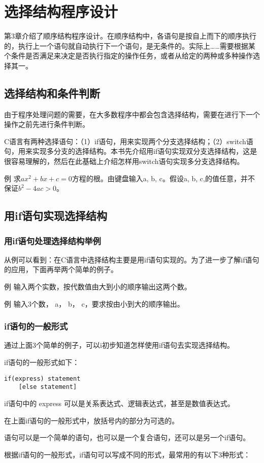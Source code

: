 \chapter{选择结构程序设计}
第3章介绍了顺序结构程序设计。在顺序结构中，各语句是按自上而下的顺序执行的，执行上一个语句就自动执行下一个语句，是无条件的。实际上……需要根据某个条件是否满足来决定是否执行指定的操作任务，或者从给定的两种或多种操作选择其一。
\section{选择结构和条件判断}
由于程序处理问题的需要，在大多数程序中都会包含选择结构，需要在进行下一个操作之前先进行条件判断。

C语言有两种选择语句：（1）if语句，用来实现两个分支选择结构；（2）switch语句，用来实现多分支的选择结构。本书先介绍用if语句实现双分支选择结构，这是很容易理解的，然后在此基础上介绍怎样用switch语句实现多分支选择结构。

例 求$a x^2 + bx + c=0$方程的根。由键盘输入a, b, c。假设a, b, c,的值任意，并不保证$b^2 -4ac >0$。
\section{用if语句实现选择结构}
\subsection{用if语句处理选择结构举例}
从例可以看到：在C语言中选择结构主要是用if语句实现的。为了进一步了解if语句的应用，下面再举两个简单的例子。

例 输入两个实数，按代数值由大到小的顺序输出这两个数。

例 输入3个数， a， b， c，要求按由小到大的顺序输出。
\subsection{if语句的一般形式}
通过上面3个简单的例子，可以i初步知道怎样使用if语句去实现选择结构。

if语句的一般形式如下：
\begin{lstlisting}
if(express) statement
	[else statement]
\end{lstlisting}
if语句中的 express 可以是关系表达式、逻辑表达式，甚至是数值表达式。

在上面if语句的一般形式中，放括号内的部分为可选的。

语句可以是一个简单的语句，也可以是一个复合语句，还可以是另一个if语句。

根据if语句的一般形式，if语句可以写成不同的形式，最常用的有以下3种形式：

